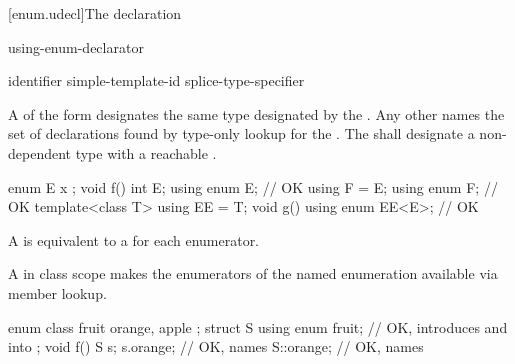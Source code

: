 [enum.udecl]{The  declaration}%
%

\begin{bnf}
\br
      using-enum-declarator \terminal{;}
\end{bnf}

\begin{bnf}
\br
     identifier\br
     simple-template-id\br
    splice-type-specifier
\end{bnf}

\pnum
A  of
the form 
designates the same type designated by the .
Any other 
names the set of declarations found by
type-only lookup
for the .
The 
shall designate a non-dependent type
with a reachable .
\begin{example}
\begin{codeblock}
enum E { x };
void f() {
  int E;
  using enum E;                 // OK
}
using F = E;
using enum F;                   // OK
template<class T> using EE = T;
void g() {
  using enum EE<E>;             // OK
}
\end{codeblock}
\end{example}

\pnum
A 
is equivalent to a  for each enumerator.

\pnum
\begin{note}
A  in class scope
makes the enumerators of the named enumeration available via member lookup.
\begin{example}
\begin{codeblock}
enum class fruit { orange, apple };
struct S {
  using enum fruit;             // OK, introduces  and  into 
};
void f() {
  S s;
  s.orange;                     // OK, names 
  S::orange;                    // OK, names 
}
\end{codeblock}
\end{example}
\end{note}

